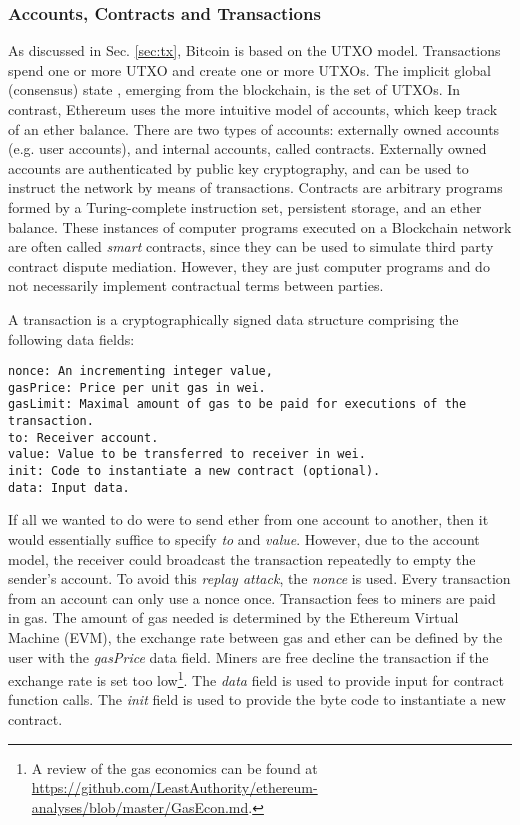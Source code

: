 \subsubsection{Accounts, Contracts and Transactions}
\label{sec:ethereum:tech:tx}
As discussed in Sec. \ref{sec:tx}, Bitcoin is based on the UTXO model. Transactions spend one or more UTXO and create one or more UTXOs. The implicit global (consensus) state , emerging from the blockchain, is the set of UTXOs. In contrast, Ethereum uses the more intuitive model of accounts, which keep track of an ether balance. There are two types of accounts: externally owned accounts (e.g. user accounts), and internal accounts, called contracts. Externally owned accounts are authenticated by public key cryptography, and can be used to instruct the network by means of transactions. Contracts are arbitrary programs formed by a Turing-complete instruction set, persistent storage, and an ether balance. These instances of computer programs executed on a Blockchain network are often called \emph{smart} contracts, since they can be used to simulate third party contract dispute mediation. However, they are just computer programs and do not necessarily implement contractual terms between parties.

A transaction is a cryptographically signed data structure comprising the following data fields:
\begin{lstlisting}[breaklines]
nonce: An incrementing integer value,
gasPrice: Price per unit gas in wei.
gasLimit: Maximal amount of gas to be paid for executions of the transaction.
to: Receiver account.
value: Value to be transferred to receiver in wei.
init: Code to instantiate a new contract (optional).
data: Input data. 
\end{lstlisting}
If all we wanted to do were to send ether from one account to another, then it would essentially suffice to specify \emph{to} and \emph{value}. However, due to the account model, the receiver could broadcast the transaction repeatedly to empty the sender's account. To avoid this \emph{replay attack}, the \emph{nonce} is used. Every transaction from an account can only use a nonce once. Transaction fees to miners are paid in gas. The amount of gas needed is determined by the Ethereum Virtual Machine (EVM), the exchange rate between gas and ether can be defined by the user with the \emph{gasPrice} data field. Miners are free decline the transaction if the exchange rate is set too low\footnote{A review of the gas economics can be found at \url{https://github.com/LeastAuthority/ethereum-analyses/blob/master/GasEcon.md}.}. The \emph{data} field is used to provide input for contract function calls. The \emph{init} field is used to provide the byte code to instantiate a new contract. 

